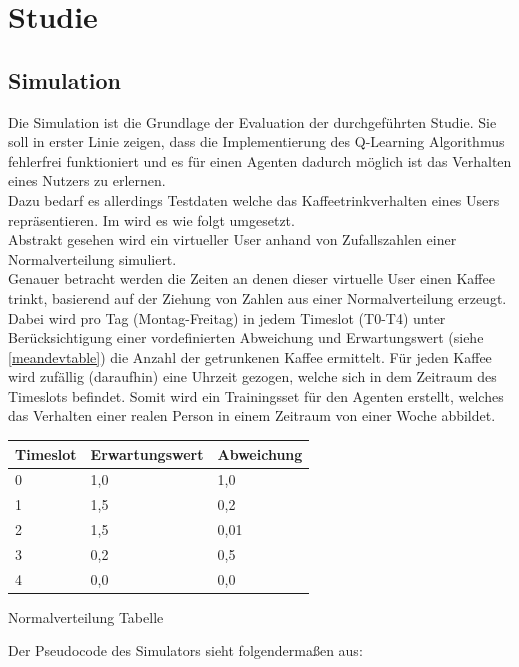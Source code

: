 \chapter{Studie}
\label{kap:Kapitel04}

\section{Simulation}
Die Simulation ist die Grundlage der Evaluation der durchgeführten Studie. Sie soll in erster Linie zeigen, dass die Implementierung des Q-Learning Algorithmus fehlerfrei funktioniert und es für einen Agenten dadurch möglich ist das Verhalten eines Nutzers zu erlernen. \\
Dazu bedarf es allerdings Testdaten welche das Kaffeetrinkverhalten eines Users repräsentieren. Im  wird es wie folgt umgesetzt.\\
Abstrakt gesehen wird ein virtueller User anhand von Zufallszahlen einer Normalverteilung simuliert.\\
Genauer betracht werden die Zeiten an denen dieser virtuelle User einen Kaffee trinkt, basierend auf der Ziehung von Zahlen aus einer Normalverteilung erzeugt.\\ Dabei wird pro Tag (Montag-Freitag) in jedem Timeslot (T0-T4) unter Berücksichtigung einer vordefinierten Abweichung und Erwartungswert (siehe \ref{meandevtable}) die Anzahl der getrunkenen Kaffee ermittelt. Für jeden Kaffee wird zufällig (daraufhin) eine Uhrzeit gezogen, welche sich in dem Zeitraum des Timeslots befindet. Somit wird ein Trainingsset für den Agenten erstellt, welches das Verhalten einer realen Person in einem Zeitraum von einer Woche abbildet.


\begin{center}
    \begin{tabular}{| l | l | l |}
    \hline
    Timeslot & Erwartungswert & Abweichung \\ \hline
    0 & 1,0 & 1,0 \\ \hline
    1 & 1,5 & 0,2 \\ \hline
    2 & 1,5 & 0,01 \\ \hline
    3 & 0,2 & 0,5 \\ \hline
    4 & 0,0 & 0,0 \\ \hline
    \end{tabular}
    \label{meandevtable}
    \caption{Normalverteilung Tabelle}
\end{center}

Der Pseudocode des Simulators sieht folgendermaßen aus:

